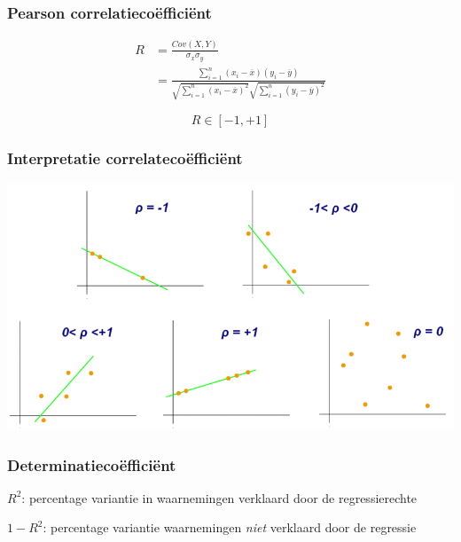 \documentclass[aspectratio=169]{beamer}
\begin{document}
\begin{frame}
\frametitle{Pearson correlatiecoëfficiënt}


\begin{align}
  R & = \frac{Cov(X, Y)}{\sigma_{x} \sigma_{y}} \\
    & = \frac{\sum_{i = 1}^{n} (x_i - \overline{x}) (y_i - \overline{y})}
             {\sqrt{\sum_{i = 1}^n (x_i - \overline{x})^2}
              \sqrt{\sum_{i = 1}^n (y_i - \overline{y})^2}}
\end{align}

\[ R \in [-1, +1] \]

\end{frame}


\begin{frame}
\frametitle{Interpretatie correlateco\"effici\"ent}

  \centering
  \includegraphics[height=.8\textheight]{img/les3-regressie.png}

\end{frame}

\begin{frame}
\frametitle{Determinatiecoëfficiënt}

$R^2$: percentage variantie in waarnemingen verklaard door de regressierechte

$1 - R^2$: percentage variantie waarnemingen \textit{niet} verklaard door de regressie

\end{frame}
\end{document}

